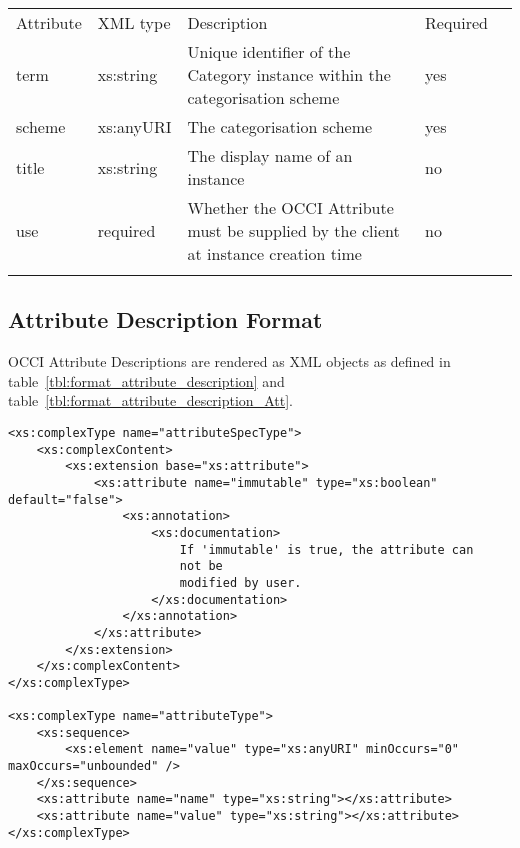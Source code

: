 \documentclass[10pt,a4paper]{article}
\begin{document}
	{
    \begin{tabularx}{\textwidth}{llXll}
    \toprule
    Attribute & XML type & Description & Required \\
    \colrule
    term & xs:string & Unique identifier of the Category instance within the categorisation scheme & yes \\
    scheme & xs:anyURI & The categorisation scheme & yes \\
    title & xs:string & The display name of an instance & no \\
    use & required & Whether the OCCI Attribute must be supplied by the client at instance creation time & no \\
    \botrule
    \end{tabularx}
}
\FloatBarrier

\subsection{Attribute Description Format}
\label{sec:format_attribute_description}

OCCI Attribute Descriptions are rendered as XML objects as defined in table~\ref{tbl:format_attribute_description} and table~\ref{tbl:format_attribute_description_Att}.

\begin{lstlisting}
<xs:complexType name="attributeSpecType">
	<xs:complexContent>
		<xs:extension base="xs:attribute">
			<xs:attribute name="immutable" type="xs:boolean" default="false">
				<xs:annotation>
					<xs:documentation>
						If 'immutable' is true, the attribute can
						not be
						modified by user.
					</xs:documentation>
				</xs:annotation>
			</xs:attribute>
		</xs:extension>
	</xs:complexContent>
</xs:complexType>

<xs:complexType name="attributeType">
	<xs:sequence>
		<xs:element name="value" type="xs:anyURI" minOccurs="0" maxOccurs="unbounded" />
	</xs:sequence>
	<xs:attribute name="name" type="xs:string"></xs:attribute>
	<xs:attribute name="value" type="xs:string"></xs:attribute>
</xs:complexType>
\end{lstlisting}
\end{document}

